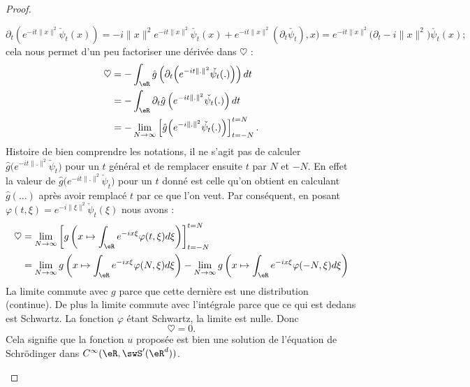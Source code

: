 \begin{proof}
\begin{subproof}
		\begin{equation}
			\partial_t\left(  e^{-it\| x \|^2}\check\psi_t(x) \right)=-i\| x \|^2 e^{-it\| x \|^2}\check{\psi_t}(x)+ e^{-it\| x \|^2}(\partial_t\check{\psi_t}),x)= e^{-it\| x \|^2}\big( \partial_t-i\| x \|^2 \big)\check{\psi_t}(x);
		\end{equation}
		cela nous permet d'un peu factoriser une dérivée dans \( \heartsuit\) :
		\begin{subequations}
			\begin{align}
				\heartsuit & =-\int_{\eR}\hat g\left( \partial_t\Big(  e^{-it\| . \|^2}\check{\psi_t}(.) \Big) \right)dt           \\
				           & =-\int_{\eR}\partial_t\hat g\left(  e^{-it\| . \|^2}\check{\psi_t}(.) \right)dt                       \\
				           & =-\lim_{N\to \infty} \left[ \hat g\Big(  e^{-i\| . \|^2}\check{\psi_t}(.) \Big) \right]_{t=-N}^{t=N}.
			\end{align}
		\end{subequations}
		Histoire de bien comprendre les notations, il ne s'agit pas de calculer \( \hat g\big(  e^{-it\| . \|^2}\check\psi_t \big)\) pour un \( t\) général et de remplacer ensuite \( t\) par \( N\) et \( -N\). En effet la valeur de \( \hat g\big(  e^{-it\| . \|^2}\check\psi_t \big)\) pour un \( t\) donné est celle qu'on obtient en calculant \( \hat g(\ldots)\) après avoir remplacé \( t\) par ce que l'on veut. Par conséquent, en posant \( \varphi(t,\xi)= e^{-i\| \xi \|^2}\check\psi_t(\xi)\) nous avons :
		\begin{subequations}
			\begin{align}
				\heartsuit & =\lim_{N\to \infty} \left[ g\left( x\mapsto\int_{\eR} e^{-ix\xi}\varphi(t,\xi )d\xi \right) \right]_{t=-N}^{t=N}                                                          \\
				           & =\lim_{N\to \infty} g\left( x\mapsto\int_{\eR} e^{-ix\xi}\varphi(N,\xi )d\xi \right)-\lim_{N\to \infty} g\left( x\mapsto\int_{\eR} e^{-ix\xi}\varphi(-N,\xi )d\xi \right)
			\end{align}
		\end{subequations}
		La limite commute avec \( g\) parce que cette dernière est une distribution (continue). De plus la limite commute avec l'intégrale parce que ce qui est dedans est Schwartz. La fonction \( \varphi\) étant Schwartz, la limite est nulle. Donc
		\begin{equation}
			\heartsuit=0.
		\end{equation}
		Cela signifie que la fonction \( u\) proposée est bien une solution de l'équation de Schrödinger dans \(  C^{\infty}(\eR,\swS'(\eR^d))\).


\end{subproof}
\end{proof}
